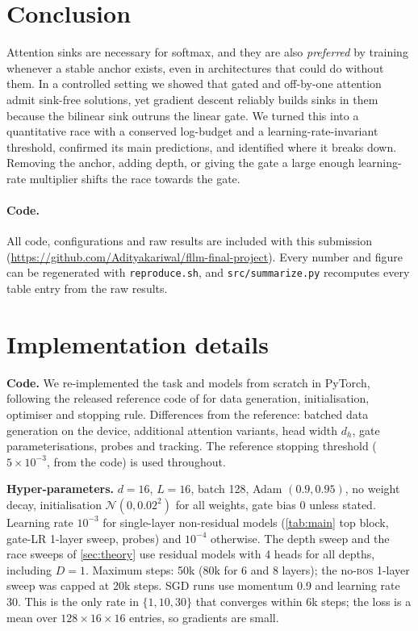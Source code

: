 \documentclass{article} %
\newcommand{\bos}{\textsc{bos}}
\begin{document}
\section{Conclusion}
Attention sinks are necessary for softmax, and they are also \emph{preferred} by training whenever a stable
anchor exists, even in architectures that could do without them. In a controlled setting we showed that gated
and off-by-one attention admit sink-free solutions, yet gradient descent reliably builds sinks in them because
the bilinear sink outruns the linear gate. We turned this into a quantitative race with a conserved
log-budget and a learning-rate-invariant threshold, confirmed its main predictions, and identified where it
breaks down. Removing the anchor, adding depth, or giving the gate a large enough learning-rate multiplier
shifts the race towards the gate.

\paragraph{Code.} All code, configurations and raw results are included with this submission
(\url{https://github.com/Adityakariwal/fllm-final-project}). Every number and figure can be regenerated with \texttt{reproduce.sh}, and
\texttt{src/summarize.py} recomputes every table entry from the raw results.




\appendix
\section{Implementation details}
\label{app:impl}
\textbf{Code.} We re-implemented the task and models from scratch in PyTorch, following the released
reference code of \citet{ranmilo2026sinks} for data generation, initialisation, optimiser and stopping
rule. Differences from the reference: batched data generation on the device, additional attention variants,
head width $d_h$, gate parameterisations, probes and tracking. The reference stopping threshold
($5\times10^{-3}$, from the code) is used throughout.

\textbf{Hyper-parameters.} $d=16$, $L=16$, batch 128, Adam $(0.9,0.95)$, no weight decay, initialisation
$\mathcal{N}(0,0.02^2)$ for all weights, gate bias $0$ unless stated. Learning rate $10^{-3}$ for
single-layer non-residual models (\cref{tab:main} top block, gate-LR 1-layer sweep, probes) and $10^{-4}$
otherwise. The depth sweep and the race sweeps of \cref{sec:theory} use residual models with 4 heads for all
depths, including $D=1$. Maximum steps: 50k (80k for 6 and 8 layers); the no-\bos{} 1-layer sweep was capped
at 20k steps. SGD runs use momentum 0.9 and learning rate 30. This is the only rate in $\{1,10,30\}$ that
converges within 6k steps; the loss is a mean over $128\times16\times16$ entries, so gradients are small.
\end{document}
